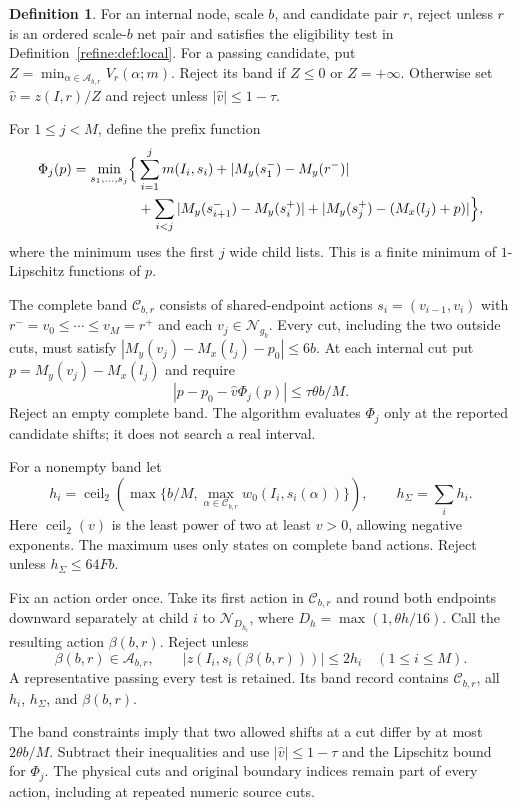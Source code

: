 \documentclass[11pt]{article}
\theoremstyle{definition}
\newtheorem{definition}[theorem]{Definition}
\newcommand{\cA}{\mathcal A}
\newcommand{\cC}{\mathcal C}
\newcommand{\1}{\mathbf 1}
\begin{document}
\begin{definition}\label{refine:def:bands}
For an internal node, scale $b$, and candidate pair $r$, reject unless
$r$ is an ordered scale-$b$ net pair and satisfies the eligibility test
in Definition~\ref{refine:def:local}. For a passing candidate, put $Z=\min_{\alpha\in\cA_{b,r}}V_r(\alpha;m)$.
Reject its band if $Z\le0$ or $Z=+\infty$.
Otherwise set $\widehat v=z(I,r)/Z$ and reject unless
$|\widehat v|\le1-\tau$.

For $1\le j<M$, define the prefix function
\[
\begin{split}
 \Phi_j(p)=\min_{s_1,\ldots,s_j}\Bigl\{&
 \sum_{i=1}^j m(I_i,s_i)
 +|M_y(s_1^-)-M_y(r^-)|\\
 &+\sum_{i<j}|M_y(s_{i+1}^-)-M_y(s_i^+)|
 +|M_y(s_j^+)-(M_x(l_j)+p)|\Bigr\},
\end{split}
\]
where the minimum uses the first $j$ wide child lists.
This is a finite minimum of $1$-Lipschitz functions of $p$.

The complete band $\cC_{b,r}$ consists of shared-endpoint actions
$s_i=(v_{i-1},v_i)$ with
$r^-=v_0\le\cdots\le v_M=r^+$ and each $v_j\in\mathcal N_{g_b}$.
Every cut, including the two outside cuts, must satisfy
$|M_y(v_j)-M_x(l_j)-p_0|\le6b$.
At each internal cut put $p=M_y(v_j)-M_x(l_j)$ and require
\[
 |p-p_0-\widehat v\Phi_j(p)|\le\tau\theta b/M.
\]
Reject an empty complete band. The algorithm evaluates $\Phi_j$ only
at the reported candidate shifts; it does not search a real interval.

For a nonempty band let
\[
 h_i=\operatorname{ceil}_2\!\left(
 \max\{b/M,\max_{\alpha\in\cC_{b,r}}w_0(I_i,s_i(\alpha))\}\right),
 \qquad h_\Sigma=\sum_i h_i.
\]
Here $\operatorname{ceil}_2(v)$ is the least power of two at least
$v>0$, allowing negative exponents. The maximum uses only states on
complete band actions. Reject unless $h_\Sigma\le64Fb$.

Fix an action order once. Take its first action in $\cC_{b,r}$ and
round both endpoints downward separately at child $i$ to
$\mathcal N_{D_{h_i}}$, where $D_h=\max(1,\theta h/16)$.
Call the resulting action $\beta(b,r)$. Reject unless
\[
 \beta(b,r)\in\cA_{b,r},\qquad
 |z(I_i,s_i(\beta(b,r)))|\le2h_i\quad(1\le i\le M).
\]
A representative passing every test is retained. Its band record
contains $\cC_{b,r}$, all $h_i$, $h_\Sigma$, and $\beta(b,r)$.
\end{definition}

The band constraints imply that two allowed shifts at a cut differ by
at most $2\theta b/M$. Subtract their inequalities and use
$|\widehat v|\le1-\tau$ and the Lipschitz bound for $\Phi_j$.
The physical cuts and original boundary indices remain part of every
action, including at repeated numeric source cuts.
\end{document}
